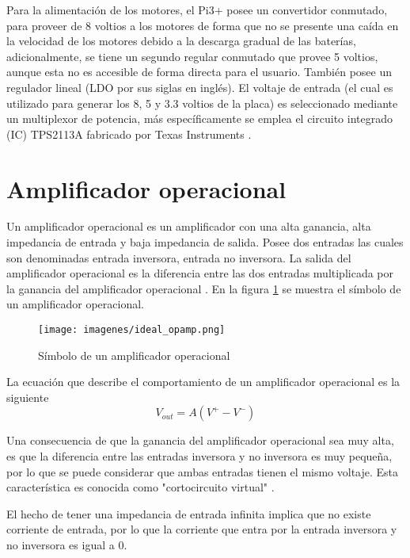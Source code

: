 Para la alimentación de los motores, el Pi3+ posee un convertidor conmutado, para proveer de 8 voltios a los motores
 de forma que no se presente una caída en la velocidad de los motores debido a la descarga gradual de las baterías,
 adicionalmente, se tiene un segundo regular conmutado que provee 5 voltios, aunque esta no es accesible de forma directa
 para el usuario. También posee un regulador lineal (LDO por sus siglas en inglés). El voltaje de entrada (el cual es 
 utilizado para generar los 8, 5 y 3.3 voltios de la placa) es seleccionado mediante un multiplexor de potencia, más 
 específicamente se emplea el circuito integrado (IC) TPS2113A fabricado por Texas Instruments \cite{noauthor_pololu_nodate}.

\section{Amplificador operacional}

Un amplificador operacional es un amplificador con una alta ganancia,
alta impedancia de entrada y baja impedancia de salida. Posee dos entradas
las cuales son denominadas entrada inversora, entrada no inversora. La salida
del amplificador operacional es la diferencia entre las dos entradas multiplicada
por la ganancia del amplificador operacional \cite{electronic_Boylestad}. En 
la figura \ref{fig:ampOp} se muestra el símbolo de un amplificador operacional.

\begin{figure}[H]
    \centering
    \texttt{[image: imagenes/ideal\_opamp.png]}
    \caption{Símbolo de un amplificador operacional \cite{electronic_Boylestad}}
    \label{fig:ampOp}
\end{figure}

La ecuación que describe el comportamiento de un amplificador operacional es la siguiente
\begin{equation}
    V_{out} = A(V^+ - V^-)
    \label{eq:ampOp}
\end{equation}

Una consecuencia de que la ganancia del amplificador operacional sea muy alta, es que
la diferencia entre las entradas inversora y no inversora es muy pequeña, por lo que
se puede considerar que ambas entradas tienen el mismo voltaje. Esta característica
es conocida como "cortocircuito virtual" \cite{electronic_Boylestad}.

 El hecho de tener una 
impedancia de entrada infinita implica que no existe corriente de entrada, por lo que
la corriente que entra por la entrada inversora y no inversora es igual a 0. 

